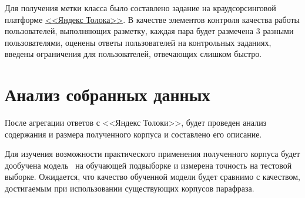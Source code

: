 \documentclass[a4paper,14pt]{extarticle}
\begin{document}
Для получения метки класса было составлено задание на краудсорсинговой платформе \href{https://toloka.yandex.ru/}{<<Яндекс Толока>>}.
В качестве элементов контроля качества работы пользователей, выполняющих разметку, каждая пара будет размечена $3$ разными пользователями, оценены ответы пользователей на контрольных заданиях, введены ограничения для пользователей, отвечающих слишком быстро.

\begin{comment}
\subsection{Выбор источника}

На русском языке существуют два крупнейших ресурса в сети Интернет, предоставляющих пользователям возможность публиковать свои и отвечать на чужие вопросы: \href{https://yandex.ru/q/}{<<Yandex Q>>} и \href{https://otvet.mail.ru/}{<<Ответы Mail.ru>>}.
Оба ресурса содержат большое количество вопросов, которые соответствуют критериям, предъявляемых к источнику предложений для решаемой задачи.
Для выбора одного из них был проведен анализ пользовательского соглашения и веб интерфейса.


\subsection{Сбор данных}
\subsection{Предварительная фильтрация}
\subsection{Отбор кандидатов на ручную классификацию}
\subsection{Ручная разметка данных}
\end{comment}

\section{Анализ собранных данных}

После агрегации ответов с <<Яндекс Толоки>>, будет проведен анализ содержания и размера полученного корпуса и составлено его описание.

Для изучения возможности практического применения полученного корпуса будет дообучена модель~\autocite{devlin2018bert} на обучающей подвыборке и измерена точность на тестовой выборке.
Ожидается, что качество обученной модели будет сравнимо с качеством, достигаемым при использовании существующих корпусов парафраза.

\printbibliography
\end{document}
